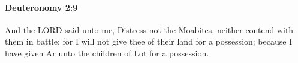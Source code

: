 
		\paragraph{Deuteronomy 2:9} %
			\label{DEUTERONOMY-2-9}

			And the LORD said unto me, Distress not the Moabites, neither contend with them in battle: for I will not give thee of their land for a possession; because I have given Ar unto the children of Lot for a possession.


